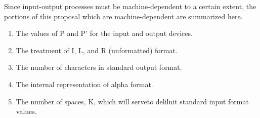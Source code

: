\documentclass[a4paper,11pt]{article}
\begin{document}
Since input-output processes must be machine-dependent to a certain
extent, the portions of this proposal which are machine-dependent are
summarized here.

\begin{enumerate}
\item The values of P and P' for the input and output devices.
\item The treatment of I, L, and R (unformatted) format.
\item The number of characters in standard output format.
\item The internal representation of alpha format.
\item The number of spaces, K, which will serveto delilnit standard
input format values.
\end{enumerate}
\end{document}
